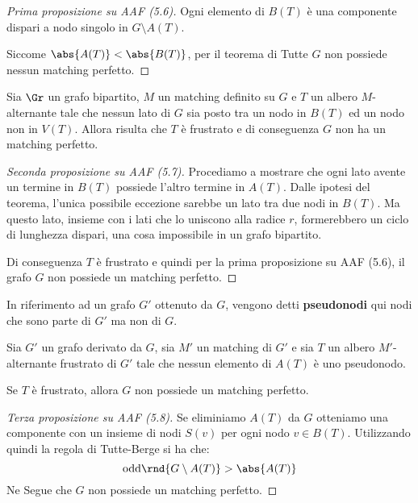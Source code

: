 \documentclass[\main/main.tex]{subfiles}
\begin{document}
\begin{proof}[Prima proposizione su AAF (5.6)]
  Ogni elemento di \(B(T)\) è una componente dispari a nodo singolo in \(G \setminus A(T)\).

  Siccome \(\abs{A(T)} < \abs{B(T)}\), per il teorema di Tutte \(G\) non possiede nessun matching perfetto.
\end{proof}
\begin{proposition}
  Sia \(\Gr \) un grafo bipartito, \(M\) un matching definito su \(G\) e \(T\) un albero \(M\)-alternante tale che nessun lato di \(G\) sia posto tra un nodo in \(B(T)\) ed un nodo non in \(V(T)\). Allora risulta che \(T\) è frustrato e di conseguenza \(G\) non ha un matching perfetto.
\end{proposition}
\begin{proof}[Seconda proposizione su AAF (5.7)]
  Procediamo a mostrare che ogni lato avente un termine in \(B(T)\) possiede l'altro termine in \(A(T)\). Dalle ipotesi del teorema, l'unica possibile eccezione sarebbe un lato tra due nodi in \(B(T)\). Ma questo lato, insieme con i lati che lo uniscono alla radice \(r\), formerebbero un ciclo di lunghezza dispari, una cosa impossibile in un grafo bipartito.

  Di conseguenza \(T\) è frustrato e quindi per la prima proposizione su AAF (5.6), il grafo \(G\) non possiede un matching perfetto.
\end{proof}
\begin{definition}[Pseudonodo]
  In riferimento ad un grafo \(G'\) ottenuto da \(G\), vengono detti \textbf{pseudonodi} qui nodi che sono parte di \(G'\) ma non di \(G\).
\end{definition}
\begin{proposition}
  Sia \(G'\) un grafo derivato da \(G\), sia \(M'\) un matching di \(G'\) e sia \(T\) un albero \(M'\)-alternante frustrato di \(G'\) tale che nessun elemento di \(A(T)\) è uno pseudonodo.

  Se \(T\) è frustrato, allora \(G\) non possiede un matching perfetto.
\end{proposition}
\begin{proof}[Terza proposizione su AAF (5.8)]
  Se eliminiamo \(A(T)\) da \(G\) otteniamo una componente con un insieme di nodi \(S(v)\) per ogni nodo \(v \in B(T)\). Utilizzando quindi la regola di Tutte-Berge si ha che:
  \[
    \text{odd}\rnd{G \setminus A(T)} > \abs{A(T)}
  \]
  Ne Segue che \(G\) non possiede un matching perfetto.
\end{proof}
\end{document}
